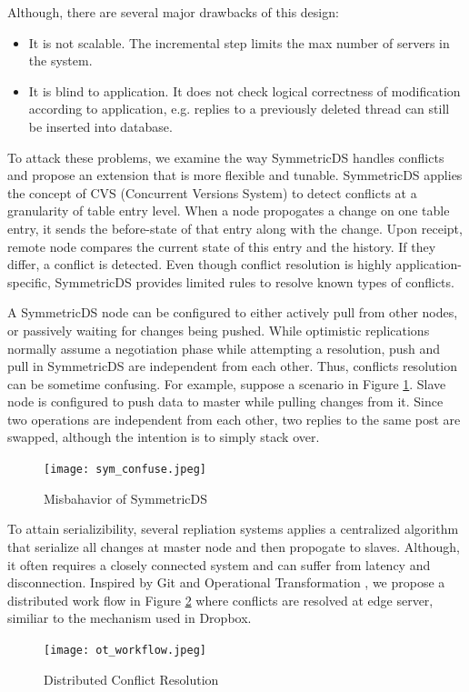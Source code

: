 Although, there are several major drawbacks of this design:
\begin{itemize}
\item It is not scalable. The incremental step limits the max number of servers in the system.
\item It is blind to application. It does not check logical correctness of modification according to application, e.g. replies to a previously deleted thread can still be inserted into database.
\end{itemize}

To attack these problems, we examine the way SymmetricDS handles conflicts and propose an extension that is more flexible and tunable. SymmetricDS applies the concept of CVS (Concurrent Versions System) to detect conflicts at a granularity of table entry level. When a node propogates a change on one table entry, it sends the before-state of that entry along with the change. Upon receipt, remote node compares the current state of this entry and the history. If they differ, a conflict is detected. Even though conflict resolution is highly application-specific, SymmetricDS provides limited rules to resolve known types of conflicts.

A SymmetricDS node can be configured to either actively pull from other nodes, or passively waiting for changes being pushed. While optimistic replications normally assume a negotiation phase while attempting a resolution, push and pull in SymmetricDS are independent from each other. Thus, conflicts resolution can be sometime confusing. For example, suppose a scenario in Figure \ref{sym_confuse}. Slave node is configured to push data to master while pulling changes from it. Since two operations are independent from each other, two replies to the same post are swapped, although the intention is to simply stack over.

\begin{figure}[htbp]
\centering
\texttt{[image: sym\_confuse.jpeg]}
\caption{Misbahavior of SymmetricDS}
\label{sym_confuse}
\end{figure}

To attain serializibility, several repliation systems applies a centralized algorithm that serialize all changes at master node and then propogate to slaves. Although, it often requires a closely connected system and can suffer from latency and disconnection. Inspired by Git and Operational Transformation \cite{ellis1989concurrency}, we propose a distributed work flow in Figure \ref{ot_workflow} where conflicts are resolved at edge server, similiar to the mechanism used in Dropbox\cite{dropbox}.
\begin{figure}[htbp]
\centering
\texttt{[image: ot\_workflow.jpeg]}
\caption{Distributed Conflict Resolution}
\label{ot_workflow}
\end{figure}

